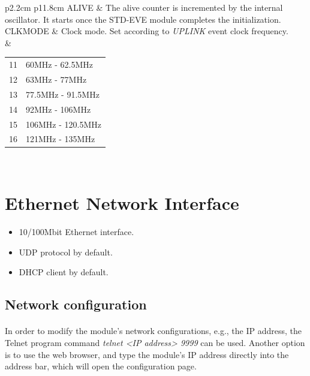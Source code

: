 \documentclass[openany]{article}
\begin{document}
				\bigskip
				\begin{tabular}{p{2.2cm} p{11.8cm}}
				ALIVE & The alive counter is incremented by the internal oscillator. It starts once the STD-EVE module completes the initialization. \\
				CLKMODE & Clock mode. Set according to \emph{UPLINK} event clock frequency. \\
				& \begin{tabular}{l l}
				   11 & 60MHz - 62.5MHz \\
				   12 & 63MHz - 77MHz \\
				   13 & 77.5MHz - 91.5MHz \\
				   14 & 92MHz - 106MHz \\
				   15 & 106MHz - 120.5MHz \\
				   16 & 121MHz - 135MHz \\
				   \end{tabular} \\				
				\end{tabular}
\FloatBarrier

\section{Ethernet Network Interface}

	\begin{itemize}
	\item 10/100Mbit Ethernet interface.
	\item UDP protocol by default.
	\item DHCP client by default.
	\end{itemize}

\etoclocalframed[1]{}

	\subsection{Network configuration}
	
		\paragraph{} In order to modify the module's network configurations, e.g., the IP address, the Telnet program command \emph{telnet {\textless}IP address{\textgreater} 9999} can be used. Another option is to use the web browser, and type the module's IP address directly into the address bar, which will open the configuration page.
\end{document}
